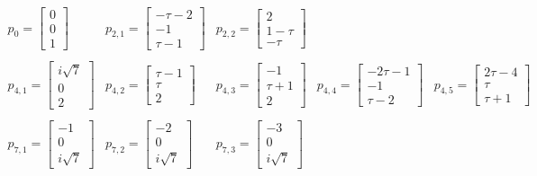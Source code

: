 \documentclass{article}[12pt]
\begin{document}
$$
\begin{array}{cccccc} p_0=\left[ \begin{array}{c} 0 \\ 0 \\ 1 \end{array}\right] & 
  p_{2,1}=\left[ \begin{array}{c} -\tau-2 \\ -1 \\ \tau-1 \end{array}\right] &
  p_{2,2}=\left[ \begin{array}{c} 2 \\ 1-\tau \\ -\tau \end{array}\right] \\
\\
  p_{4,1}=\left[ \begin{array}{c} i\sqrt{7} \\ 0 \\ 2 \end{array}\right]  &
  p_{4,2}=\left[ \begin{array}{c} \tau-1 \\ \tau \\ 2  \end{array}\right] &
  p_{4,3}=\left[ \begin{array}{c} -1 \\ \tau+1 \\ 2  \end{array}\right] &
  p_{4,4}=\left[ \begin{array}{c} -2\tau-1 \\ -1 \\ \tau-2  \end{array}\right] &
  p_{4,5}=\left[ \begin{array}{c}  2\tau-4 \\ \tau \\ \tau+1  \end{array}\right] \\
\\
  p_{7,1}=\left[ \begin{array}{c} -1 \\ 0 \\ i\sqrt{7} \end{array}\right]  &
  p_{7,2}=\left[ \begin{array}{c} -2 \\ 0 \\ i\sqrt{7} \end{array}\right]  &
  p_{7,3}=\left[ \begin{array}{c} -3 \\ 0 \\ i\sqrt{7} \end{array}\right]  &

\end{array}$$
\end{document}
